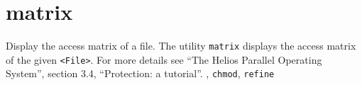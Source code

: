 \section{matrix}
\begin{man}
  \PP Display the access matrix of a file.
  \DE The utility {\tt matrix} displays the access matrix of the given {\tt <File>}.
             For more details see ``The Helios Parallel Operating System'',
             section 3.4, ``Protection: a tutorial''.
  , {\tt chmod}, {\tt refine}
\end{man}
